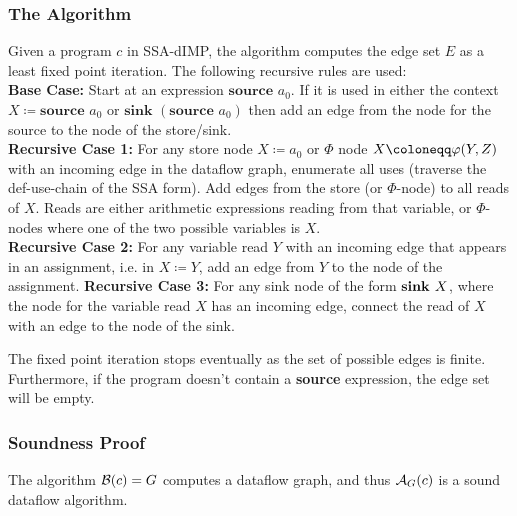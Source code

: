 \subsubsection*{The Algorithm}
Given a program $c$ in SSA-dIMP, the algorithm computes
the edge set $E$ as a least fixed point iteration.
The following recursive rules are used:\\
\textbf{Base Case:} Start at an expression $\textbf{source }a_0$.
If it is used in either the context $X \coloneqq \textbf{source }a_0$
or $\textbf{sink }(\textbf{source }a_0)$ then add an edge from the node for the
source to the node of the store/sink.\\
\textbf{Recursive Case 1:} For any store node $X \coloneqq a_0$ or
$\Phi$ node $\phistore{X}{Y}{Z}$ with an incoming edge
in the dataflow graph, enumerate all uses (traverse
the def-use-chain of the SSA form). Add edges from the store (or $\Phi$-node)
to all reads of $X$.
Reads are either arithmetic expressions reading from that variable,
or $\Phi$-nodes where one of the two possible variables is $X$.\\
\textbf{Recursive Case 2:} For any variable read $Y$ with an incoming edge that appears in an 
assignment, i.e. in $X \coloneqq Y$, add an edge from $Y$ to the node of the assignment.
\textbf{Recursive Case 3:} For any sink node of the form $\textbf{sink }{X}$,
where the node for the variable read $X$ has an incoming edge, connect 
the read of $X$ with an edge to the node of the sink.

The fixed point iteration stops eventually as the set of possible edges is
finite. Furthermore, if the program doesn't contain a \textbf{source} expression,
the edge set will be empty.

\subsubsection*{Soundness Proof}
\begin{theorem}
    \label{thm:df-soundness}
    The algorithm $\operatorname{\mathcal{B}}(c) = G$ computes a dataflow graph, and thus 
    $\operatorname{\mathcal{A}}_G(c)$ is a sound dataflow algorithm.
\end{theorem}

